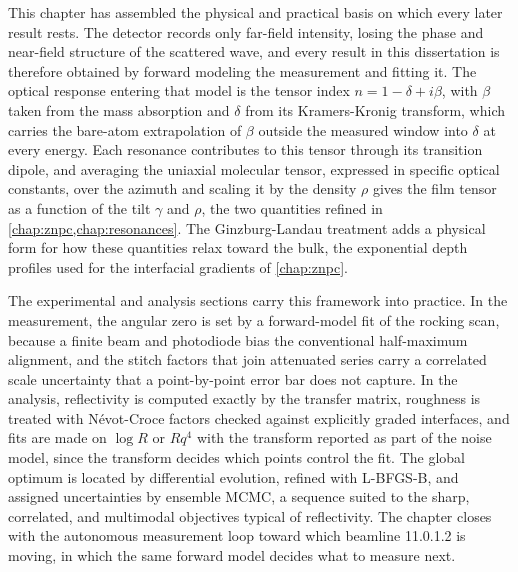 This chapter has assembled the physical and practical basis on which every later result rests. The detector records only far-field intensity, losing the phase and near-field structure of the scattered wave, and every result in this dissertation is therefore obtained by forward modeling the measurement and fitting it. The optical response entering that model is the tensor index \(n = 1 - \delta + i\beta\), with \(\beta\) taken from the mass absorption and \(\delta\) from its Kramers-Kronig transform, which carries the bare-atom extrapolation of \(\beta\) outside the measured window into \(\delta\) at every energy. Each resonance contributes to this tensor through its transition dipole, and averaging the uniaxial molecular tensor, expressed in specific optical constants, over the azimuth and scaling it by the density \(\rho\) gives the film tensor as a function of the tilt \(\gamma\) and \(\rho\), the two quantities refined in \cref{chap:znpc,chap:resonances}. The Ginzburg-Landau treatment adds a physical form for how these quantities relax toward the bulk, the exponential depth profiles used for the interfacial gradients of \cref{chap:znpc}.

The experimental and analysis sections carry this framework into practice. In the measurement, the angular zero is set by a forward-model fit of the rocking scan, because a finite beam and photodiode bias the conventional half-maximum alignment, and the stitch factors that join attenuated series carry a correlated scale uncertainty that a point-by-point error bar does not capture. In the analysis, reflectivity is computed exactly by the transfer matrix, roughness is treated with Névot-Croce factors checked against explicitly graded interfaces, and fits are made on \(\log R\) or \(Rq^{4}\) with the transform reported as part of the noise model, since the transform decides which points control the fit. The global optimum is located by differential evolution, refined with L-BFGS-B, and assigned uncertainties by ensemble MCMC, a sequence suited to the sharp, correlated, and multimodal objectives typical of reflectivity. The chapter closes with the autonomous measurement loop toward which beamline 11.0.1.2 is moving, in which the same forward model decides what to measure next.
